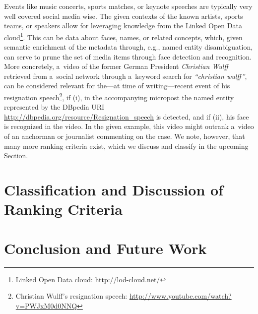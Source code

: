 \documentclass[runningheads,a4paper,11pt]{llncs}
\begin{document}
Events like music concerts, sports matches, or keynote speeches
are typically very well covered social media wise.
The given contexts of the known artists, sports teams, or speakers
allow for leveraging knowledge from the
Linked Open Data cloud\footnote{Linked Open Data cloud: \url{http://lod-cloud.net/}}.
This can be data about faces, names, or related concepts,
which, given semantic enrichment of the metadata through, e.g.,
named entity disambiguation, can serve to prune the set of media items
through face detection and recognition.
More concretely, a~video of the former German President \emph{Christian Wulff}
retrieved from a~social network through a~keyword search for \emph{``christian wulff''},
can be considered relevant for the---at time of writing---recent
event of his resignation speech\footnote{Christian Wulff's resignation speech: \url{http://www.youtube.com/watch?v=PWJxM0d0NNQ}},
if (i), in the accompanying micropost the named entity represented by the DBpedia URI
\url{http://dbpedia.org/resource/Resignation_speech} is detected,
and if (ii), his face is recognized in the video.
In the given example, this video might outrank a~video of an anchorman or journalist commenting on the case.
We note, however, that many more ranking criteria exist, which we discuss and classify in the upcoming Section.

\section{Classification and Discussion of Ranking Criteria}

\section{Conclusion and Future Work}

\renewcommand{\ttdefault}{cmvtt}
\renewcommand\UrlFont\tt



\end{document}
